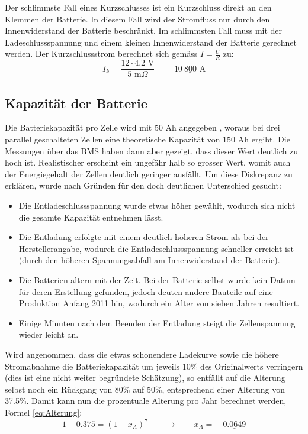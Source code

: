 Der schlimmste Fall eines Kurzschlusses ist ein Kurzschluss direkt an den Klemmen der Batterie. In diesem Fall wird der Stromfluss nur durch den Innenwiderstand der Batterie beschränkt. Im schlimmsten Fall muss mit der Ladeschlussspannung und einem kleinen Innenwiderstand der Batterie gerechnet werden. Der Kurzschlussstrom berechnet sich gemäss $I=\frac{U}{R}$ zu:
\begin{equation*}
	I_k=\frac{12\cdot 4.2\text{ V}}{5\text{ m}\Omega}=\quad\underline{10\ 800\text{ A}}
\end{equation*}

\subsection{Kapazität der Batterie}\label{sec:ah}
\color{blue}Die Batteriekapazität pro Zelle wird mit $50$ Ah angegeben \cite{lev50}, woraus bei drei parallel geschalteten Zellen eine theoretische Kapazität von $150$ Ah ergibt. Die Messungen über das BMS haben dann aber gezeigt, dass dieser Wert deutlich zu hoch ist. Realistischer erscheint ein ungefähr halb so grosser Wert, womit auch der Energiegehalt der Zellen deutlich geringer ausfällt. Um diese Diskrepanz zu erklären, wurde nach Gründen für den doch deutlichen Unterschied gesucht: \begin{itemize}
	\item Die Entladeschlussspannung wurde etwas höher gewählt, wodurch sich nicht die gesamte Kapazität entnehmen lässt.
	\item Die Entladung erfolgte mit einem deutlich höheren Strom als bei der Herstellerangabe, wodurch die Entladeschlussspannung schneller erreicht ist (durch den höheren Spannungsabfall am Innenwiderstand der Batterie).
	\item Die Batterien altern mit der Zeit. Bei der Batterie selbst wurde kein Datum für deren Erstellung gefunden, jedoch deuten andere Bauteile auf eine Produktion Anfang 2011 hin, wodurch ein Alter von sieben Jahren resultiert.
	\item Einige Minuten nach dem Beenden der Entladung steigt die Zellenspannung wieder leicht an.
\end{itemize}

Wird angenommen, dass die etwas schonendere Ladekurve sowie die höhere Stromabnahme die Batteriekapazität um jeweils 10\% des Originalwerts verringern (dies ist eine nicht weiter begründete Schätzung), so entfällt auf die Alterung selbst noch ein Rückgang von 80\% auf 50\%, entsprechend einer Alterung von 37.5\%. Damit kann nun die prozentuale Alterung pro Jahr berechnet werden, Formel \ref{eq:Alterung}:
\begin{equation}
	1-0.375=\left(1-x_A\right)^7\qquad\rightarrow\qquad x_A=\quad\underline{0.0649}
\label{eq:Alterung}
\end{equation}

